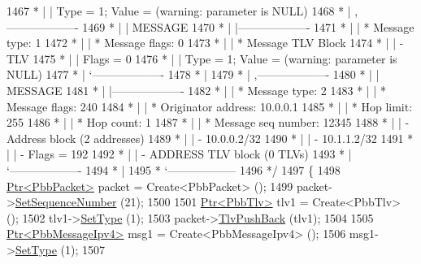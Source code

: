 \begin{DoxyCode}
1467 \textcolor{comment}{         * |    |         Type = 1; Value = (warning: parameter is NULL)}
1468 \textcolor{comment}{         * |    ,-------------------}
1469 \textcolor{comment}{         * |    |  MESSAGE}
1470 \textcolor{comment}{         * |    |-------------------}
1471 \textcolor{comment}{         * |    | * Message type:       1}
1472 \textcolor{comment}{         * |    | * Message flags:  0}
1473 \textcolor{comment}{         * |    | * Message TLV Block}
1474 \textcolor{comment}{         * |    |     - TLV}
1475 \textcolor{comment}{         * |    |         Flags = 0}
1476 \textcolor{comment}{         * |    |         Type = 1; Value = (warning: parameter is NULL)}
1477 \textcolor{comment}{         * |    `-------------------}
1478 \textcolor{comment}{         * |}
1479 \textcolor{comment}{         * |    ,-------------------}
1480 \textcolor{comment}{         * |    |  MESSAGE}
1481 \textcolor{comment}{         * |    |-------------------}
1482 \textcolor{comment}{         * |    | * Message type:       2}
1483 \textcolor{comment}{         * |    | * Message flags:  240}
1484 \textcolor{comment}{         * |    | * Originator address: 10.0.0.1}
1485 \textcolor{comment}{         * |    | * Hop limit:          255}
1486 \textcolor{comment}{         * |    | * Hop count:          1}
1487 \textcolor{comment}{         * |    | * Message seq number: 12345}
1488 \textcolor{comment}{         * |    | - Address block (2 addresses)}
1489 \textcolor{comment}{         * |    |     - 10.0.0.2/32}
1490 \textcolor{comment}{         * |    |     - 10.1.1.2/32}
1491 \textcolor{comment}{         * |    |     - Flags = 192}
1492 \textcolor{comment}{         * |    | - ADDRESS TLV block (0 TLVs)}
1493 \textcolor{comment}{         * |    `-------------------}
1494 \textcolor{comment}{         * |}
1495 \textcolor{comment}{         * `------------------}
1496 \textcolor{comment}{   */}
1497   \{
1498     \hyperlink{classns3_1_1Ptr}{Ptr<PbbPacket>} packet = Create<PbbPacket> ();
1499     packet->\hyperlink{classns3_1_1PbbPacket_a7d6a1602be86109760d0f26ff9bbbb8e}{SetSequenceNumber} (21);
1500 
1501     \hyperlink{classns3_1_1Ptr}{Ptr<PbbTlv>} tlv1 = Create<PbbTlv> ();
1502     tlv1->\hyperlink{classns3_1_1PbbTlv_a90a0452018ed364ac37c3ad116dd718b}{SetType} (1);
1503     packet->\hyperlink{classns3_1_1PbbPacket_a34935793e729a106c176db99c969cb42}{TlvPushBack} (tlv1);
1504 
1505     \hyperlink{classns3_1_1Ptr}{Ptr<PbbMessageIpv4>} msg1 = Create<PbbMessageIpv4> ();
1506     msg1->\hyperlink{classns3_1_1PbbMessage_a4b3d1eaabd3e7412a46ac79bf3360dac}{SetType} (1);
1507 

\end{DoxyCode}
